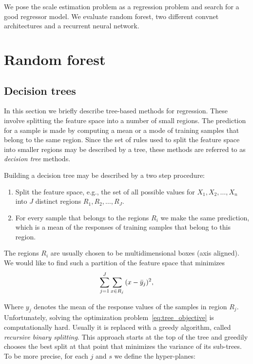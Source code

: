 We pose the scale estimation problem as a regression problem and
search for a good regressor model.  We evaluate random forest, two
different convnet architectures and a recurrent neural network.

\section{Random forest}

\subsection{Decision trees}

In this section we briefly describe tree-based methods for regression.
These involve splitting the feature space into a number of small
regions.  The prediction for a sample is made by computing a mean or a
mode of training samples that belong to the same region.  Since the
set of rules used to split the feature space into smaller regions may
be described by a tree, these methods are referred to as
\textit{decision tree} methods.

Building a decision tree may be described by a two step procedure:
\begin{enumerate}
\item Split the feature space, e.g., the set of all possible values
  for $X_1, X_2,\ldots,X_n$ into $J$ distinct regions $R_1, R_2,\ldots, R_J$.
\item For every sample that belongs to the regions $R_i$ we make the
  same prediction, which is a mean of the responses of training
  samples that belong to this region.
\end{enumerate}

The regions $R_i$ are usually chosen to be multidimensional boxes
(axis aligned).  We would like to find such a partition of the feature
space that minimizes
\begin{equation}\label{eq:tree_objective}
\sum\limits_{j=1}^J\sum_{x\in R_j}{(x-\bar{y}_j)^2},
\end{equation}

Where $y_j$ denotes the mean of the response values of the samples in
region $R_j$.  Unfortunately, solving the optimization
problem~\ref{eq:tree_objective} is computationally hard.  Usually it
is replaced with a greedy algorithm, called \textit{recursive binary
  splitting}.  This approach starts at the top of the tree and
greedily chooses the best split at that point that minimizes the
variance of its sub-trees.  To be more precise, for each $j$ and $s$
we define the hyper-planes:

